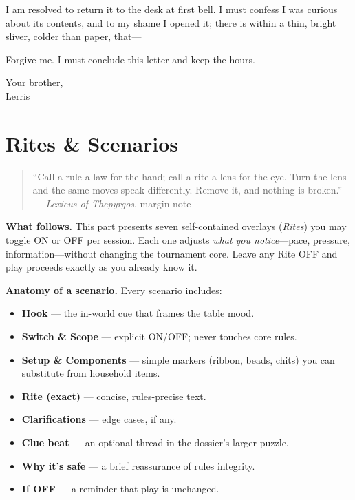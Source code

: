\documentclass[11pt]{article}
\begin{document}
I am resolved to return it to the desk at first bell. I must confess I was curious about its contents, and to my shame I opened it; there is within a thin, bright sliver, colder than paper, that—

\medskip
\noindent Forgive me. I must conclude this letter and keep the hours.

\medskip
\noindent Your brother, \\
Lerris

\clearpage


\section{Rites \& Scenarios}
\label{part:rites}

\begin{quote}\small
``Call a rule a law for the hand; call a rite a lens for the eye.  
Turn the lens and the same moves speak differently. Remove it, and nothing is broken.''\\
\hfill — \textit{Lexicus of Thepyrgos}, margin note
\end{quote}

\noindent\textbf{What follows.} This part presents seven self-contained overlays (\emph{Rites}) you may toggle \textsc{ON} or \textsc{OFF} per session. Each one adjusts \textit{what you notice}—pace, pressure, information—without changing the tournament core. Leave any Rite \textsc{OFF} and play proceeds exactly as you already know it.

\medskip
\noindent\textbf{Anatomy of a scenario.} Every scenario includes:
\begin{itemize}\setlength\itemsep{0.3em}
  \item \textbf{Hook} — the in-world cue that frames the table mood.
  \item \textbf{Switch \& Scope} — explicit \textsc{ON/OFF}; never touches core rules.
  \item \textbf{Setup \& Components} — simple markers (ribbon, beads, chits) you can substitute from household items.
  \item \textbf{Rite (exact)} — concise, rules-precise text.
  \item \textbf{Clarifications} — edge cases, if any.
  \item \textbf{Clue beat} — an optional thread in the dossier’s larger puzzle.
  \item \textbf{Why it’s safe} — a brief reassurance of rules integrity.
  \item \textbf{If \textsc{OFF}} — a reminder that play is unchanged.
\end{itemize}
\end{document}
